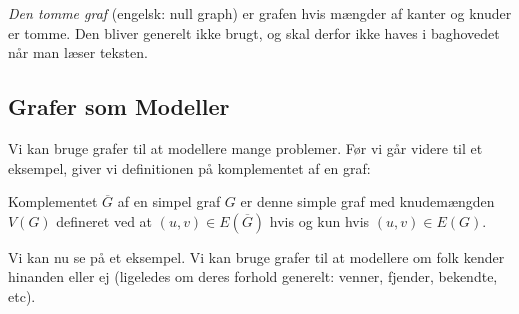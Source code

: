\begin{remark}
	\textit{Den tomme graf} (engelsk: null graph) er grafen hvis mængder af kanter og knuder er tomme. Den bliver generelt ikke brugt, og skal derfor ikke haves i baghovedet når man læser teksten.
\end{remark}

\subsection{Grafer som Modeller}%
\label{subsec:grafersommodeller}

Vi kan bruge grafer til at modellere mange problemer. Før vi går videre til et eksempel, giver vi definitionen på komplementet af en graf:
\begin{definition}
	Komplementet $\overline{G}$ af en simpel graf $G$ er denne simple graf med knudemængden $V(G)$ defineret ved at $(u,v) \in E(\overline{G})$ hvis og kun hvis $(u,v) \in E(G)$.
\end{definition}

Vi kan nu se på et eksempel. Vi kan bruge grafer til at modellere om folk kender hinanden eller ej (ligeledes om deres forhold generelt: venner, fjender, bekendte, etc).


